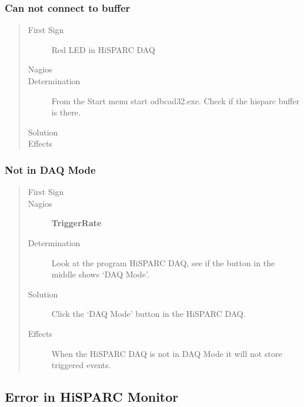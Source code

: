 \documentclass[a4paper,11pt,english]{sphinxmanual}
\begin{document}
\subsubsection{Can not connect to buffer}
\label{known-issues:can-not-connect-to-buffer}\begin{quote}\begin{description}
\item[{First Sign}] \leavevmode
Red LED in HiSPARC DAQ

\item[{Nagios}] \leavevmode
\item[{Determination}] \leavevmode
From the Start menu start odbcad32.exe. Check if the hisparc buffer is there.

\item[{Solution}] \leavevmode
\item[{Effects}] \leavevmode
\end{description}\end{quote}


\subsubsection{Not in DAQ Mode}
\label{known-issues:not-in-daq-mode}\begin{quote}\begin{description}
\item[{First Sign}] \leavevmode
\item[{Nagios}] \leavevmode
\textbf{TriggerRate}

\item[{Determination}] \leavevmode
Look at the program HiSPARC DAQ, see if the button in the middle shows `DAQ Mode'.

\item[{Solution}] \leavevmode
Click the `DAQ Mode' button in the HiSPARC DAQ.

\item[{Effects}] \leavevmode
When the HiSPARC DAQ is not in DAQ Mode it will not store triggered events.

\end{description}\end{quote}


\subsection{Error in HiSPARC Monitor}
\label{known-issues:error-in-hisparc-monitor}
\end{document}
